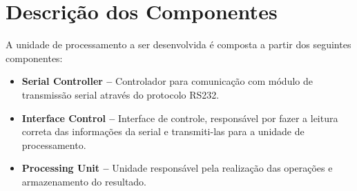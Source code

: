 \section{Descrição dos Componentes}
  A unidade de processamento a ser desenvolvida é composta a partir dos seguintes componentes:

  \begin{itemize}
    \item \textbf{Serial Controller --} Controlador para comunicação com módulo de transmissão serial através do protocolo RS232.
    \item \textbf{Interface Control --} Interface de controle, responsável por fazer a leitura correta das informações da serial e transmiti-las para a unidade de processamento.
    \item \textbf{Processing Unit --} Unidade responsável pela realização das operações e armazenamento do resultado.
  \end{itemize}